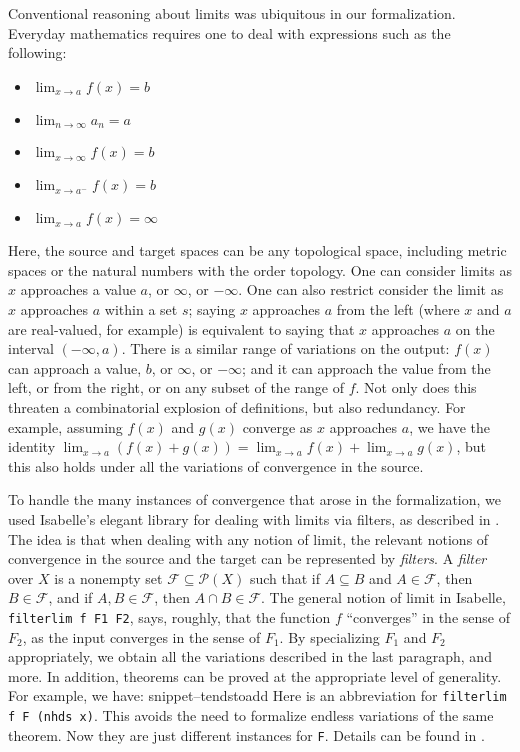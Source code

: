 \documentclass{svjour3}
\newcommand{\Snippet}[1]{\csname snippet--#1\endcsname}
\begin{document}
Conventional reasoning about limits was ubiquitous in our formalization. Everyday mathematics requires one to deal with expressions such as the following:
\begin{itemize}
 \item $\lim_{x \to a} f(x) = b$
 \item $\lim_{n \to \infty} a_n = a$
 \item $\lim_{x \to \infty} f(x) = b$
 \item $\lim_{x \to a^-} f(x) = b$
 \item $\lim_{x \to a} f(x) = \infty$
\end{itemize}
Here, the source and target spaces can be any topological space, including metric spaces or the natural numbers with the order topology. One can consider limits as $x$ approaches a value $a$, or $\infty$, or $-\infty$. One can also restrict consider the limit as $x$ approaches $a$ within a set $s$; saying $x$ approaches $a$ from the left (where $x$ and $a$ are real-valued, for example) is equivalent to saying that $x$ approaches $a$ on the interval $(-\infty, a)$. There is a similar range of variations on the output: $f(x)$ can approach a value, $b$, or $\infty$, or $-\infty$; and it can approach the value from the left, or from the right, or on any subset of the range of $f$. Not only does this threaten a combinatorial explosion of definitions, but also redundancy. For example, assuming $f(x)$ and $g(x)$ converge as $x$ approaches $a$, we have the identity $\lim_{x \to a} (f(x) + g(x)) = \lim_{x \to a} f(x) + \lim_{x \to a} g(x)$, but this also holds under all the variations of convergence in the source.

To handle the many instances of convergence that arose in the formalization, we used Isabelle's elegant library for dealing with limits via filters, as described in \cite{hoelzl:et:al:13}. The idea is that when dealing with any notion of limit, the relevant notions of convergence in the source and the target can be represented by \emph{filters}. A {\em filter} over $X$ is a nonempty set $\mathcal F \subseteq \mathcal P(X)$ such that if $A \subseteq B$ and $A \in \mathcal F$, then $B \in \mathcal F$, and if $A, B \in \mathcal F$, then $A \cap B \in \mathcal F$. The general notion of limit in Isabelle, {\tt filterlim f F1 F2}, says, roughly, that the function $f$ ``converges'' in the sense of $F_2$, as the input converges in the sense of $F_1$. By specializing $F_1$ and $F_2$ appropriately, we obtain all the variations described in the last paragraph, and more. In addition, theorems can be proved at the appropriate level of generality. For example, we have:
\Snippet{tendstoadd} 
Here  is an abbreviation for {\tt filterlim f F (nhds x)}. This avoids the need to formalize endless variations of the same theorem. Now they are just different instances for {\tt F}. Details can be found in \cite{hoelzl:et:al:13}.
\end{document}
